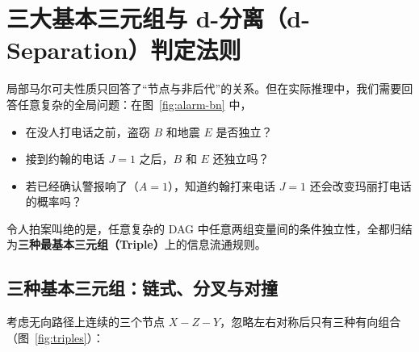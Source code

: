\section{三大基本三元组与 d-分离（d-Separation）判定法则}\label{sec:bn-dsep}

局部马尔可夫性质只回答了“节点与非后代”的关系。但在实际推理中，我们需要回答任意复杂的全局问题：在图~\ref{fig:alarm-bn} 中，
\begin{itemize}
  \item 在没人打电话之前，盗窃 $B$ 和地震 $E$ 是否独立？
  \item 接到约翰的电话 $J=1$ 之后，$B$ 和 $E$ 还独立吗？
  \item 若已经确认警报响了（$A=1$），知道约翰打来电话 $J=1$ 还会改变玛丽打电话的概率吗？
\end{itemize}
令人拍案叫绝的是，任意复杂的 DAG 中任意两组变量间的条件独立性，全都归结为\textbf{三种最基本三元组（Triple）}上的信息流通规则。

\subsection{三种基本三元组：链式、分叉与对撞}

考虑无向路径上连续的三个节点 $X - Z - Y$，忽略左右对称后只有三种有向组合（图~\ref{fig:triples}）：

